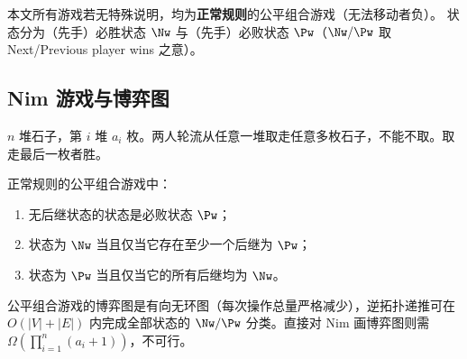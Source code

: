 
% 
% 

	
本文所有游戏若无特殊说明，均为\textbf{正常规则}的公平组合游戏（无法移动者负）。
状态分为（先手）必胜状态 $\Nw$ 与（先手）必败状态 $\Pw$（$\Nw/\Pw$ 取 Next/Previous player wins 之意）。

\subsection{Nim 游戏与博弈图}

\begin{game}[Nim]
	$n$ 堆石子，第 $i$ 堆 $a_i$ 枚。两人轮流从任意一堆取走任意多枚石子，不能不取。取走最后一枚者胜。
\end{game}

\begin{lemma}[状态分类引理]
	正常规则的公平组合游戏中：
	\begin{enumerate}
		\item 无后继状态的状态是必败状态 $\Pw$；
		\item 状态为 $\Nw$ 当且仅当它存在至少一个后继为 $\Pw$；
		\item 状态为 $\Pw$ 当且仅当它的所有后继均为 $\Nw$。
	\end{enumerate}
	公平组合游戏的博弈图是有向无环图（每次操作总量严格减少），逆拓扑递推可在 $O(|V|+|E|)$ 内完成全部状态的 $\Nw/\Pw$ 分类。直接对 Nim 画博弈图则需 $\Omega\!\left(\prod_{i=1}^n(a_i+1)\right)$，不可行。
\end{lemma}

